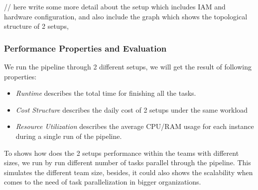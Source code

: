 // here write some more detail about the setup which includes IAM and hardware configuration, and also include the graph which shows the topological structure of 2 setups,

\subsubsection{Performance Properties and Evaluation}
We run the pipeline through 2 different setups, we will get the result of following properties:
\begin{itemize}
    \item \textit{Runtime} describes the total time for finishing all the tasks.
    \item \textit{Cost Structure} describes the daily cost of 2 setups under the same workload
    \item \textit{Resource Utilization} describes the average CPU/RAM usage for each instance during a single run of the pipeline.
\end{itemize}
To shows how does the 2 setups performance within the teams with different sizes, we run by run different number of tasks parallel through the pipeline. This simulates the different team size, besides, it could also shows the scalability when comes to the need of task parallelization in bigger organizations.
